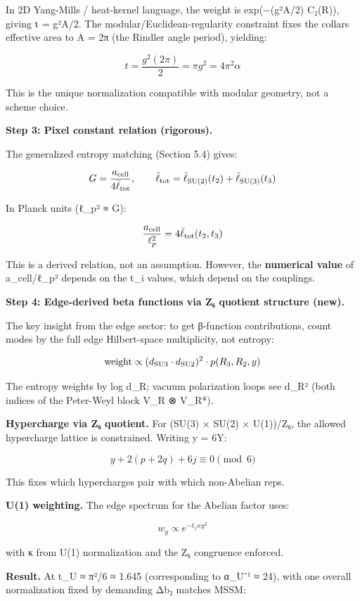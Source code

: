 In 2D Yang-Mills / heat-kernel language, the weight is exp(−(g²A/2) C₂(R)), giving t = g²A/2. The modular/Euclidean-regularity constraint fixes the collar\textquotesingle s effective area to A = 2π (the Rindler angle period), yielding:

\[
t = \frac{g^2(2\pi)}{2} = \pi g^2 = 4\pi^2 \alpha
\]

This is the unique normalization compatible with modular geometry, not a scheme choice.

\textbf{Step 3: Pixel constant relation (rigorous).}

The generalized entropy matching (Section 5.4) gives:

\[
G = \frac{a_{\rm cell}}{4\bar{\ell}_{\rm tot}}, \qquad
\bar{\ell}_{\rm tot} = \bar{\ell}_{\rm SU(2)}(t_2) + \bar{\ell}_{\rm SU(3)}(t_3)
\]

In Planck units (ℓ\_p² ≡ G):

\[
\frac{a_{\rm cell}}{\ell_p^2} = 4\bar{\ell}_{\rm tot}(t_2, t_3)
\]

This is a derived relation, not an assumption. However, the \textbf{numerical value} of a\_cell/ℓ\_p² depends on the t\_i values, which depend on the couplings.

\textbf{Step 4: Edge-derived beta functions via Z₆ quotient structure (new).}

The key insight from the edge sector: to get β-function contributions, count modes by the full edge Hilbert-space multiplicity, not entropy:

\[
\text{weight} \propto (d_{\rm SU3} \cdot d_{\rm SU2})^2 \cdot p(R_3, R_2, y)
\]

The entropy weights by log d\_R; vacuum polarization loops see d\_R² (both indices of the Peter-Weyl block V\_R ⊗ V\_R*).

\textbf{Hypercharge via Z₆ quotient.} For (SU(3) × SU(2) × U(1))/Z₆, the allowed hypercharge lattice is constrained. Writing y = 6Y:

\[
y + 2(p + 2q) + 6j \equiv 0 \pmod{6}
\]

This fixes which hypercharges pair with which non-Abelian reps.

\textbf{U(1) weighting.} The edge spectrum for the Abelian factor uses:

\[
w_y \propto e^{-t_1 \kappa y^2}
\]

with κ from U(1) normalization and the Z₆ congruence enforced.

\textbf{Result.} At t\_U ≈ π²/6 ≈ 1.645 (corresponding to α\_U⁻¹ ≈ 24), with one overall normalization fixed by demanding Δb₂ matches MSSM:

